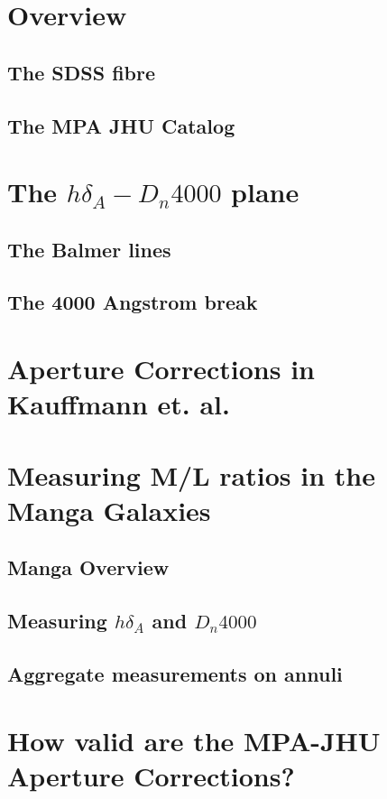 \documentclass{article}
\begin{document}
\section{Overview}
\subsection{The SDSS fibre}
\subsection{The MPA JHU Catalog}

\section{The $h\delta_{A}-D_{n}4000$ plane}

\subsection{The Balmer lines}
\subsection{The 4000 Angstrom break }

\section{Aperture Corrections in Kauffmann et. al.}

\section{Measuring M/L ratios in the Manga Galaxies}
\subsection{Manga Overview}

\subsection{Measuring  $h\delta_{A}$ and $D_{n}4000$}

\subsection{Aggregate measurements on annuli}

\section{How valid are the MPA-JHU Aperture Corrections?}
\end{document}
